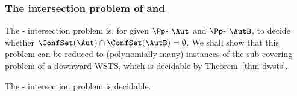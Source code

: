 

\subsubsection{The intersection problem of {\WOTrNFA} and {\NFA}} \label{sec:fatrnfa}
The {\WOTrNFA}-{\NFA} intersection problem is, for given $\Pp$-{\WOTrNFA} $\Aut$ and $\Pp$-{\NFA} $\AutB$, to decide  whether $\ConfSet(\Aut) \cap \ConfSet(\AutB) = \emptyset$. We shall show that this problem %
can be reduced to (polynomially many) instances of the sub-covering problem of a downward-WSTS, which is decidable by Theorem~\ref{thm-dwsts}.

\begin{proposition}\label{prop-wstrnfa-nfa-intersect}
	The {\WOTrNFA}-{\NFA} intersection problem is decidable.
\end{proposition}







